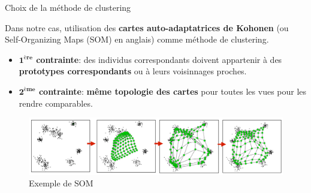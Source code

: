 \documentclass[hyperref={pdfpagelabels=false}]{beamer}
\begin{document}
        \begin{frame}{Choix de la méthode de clustering}

            Dans notre cas, utilisation des \textbf{cartes auto-adaptatrices de 
            Kohonen} (ou Self-Organizing Maps (SOM) en anglais) comme méthode de 
            clustering.

            \begin{itemize}
                \item \textbf{$\mathbf{1^{ère}}$ contrainte}: des individus 
                    correspondants doivent appartenir à des \textbf{prototypes 
                    correspondants} ou à leurs voisinnages proches.
                \item \textbf{$\mathbf{2^{ème}}$ contrainte}: \textbf{même 
                    topologie des cartes} pour toutes les vues pour les rendre 
                    comparables.
            \end{itemize}

            \begin{figure}[b]
                \centering
                \includegraphics[scale=.43]{SOM2}
                \caption{Exemple de SOM}
            \end{figure}
        \end{frame}
\end{document}
